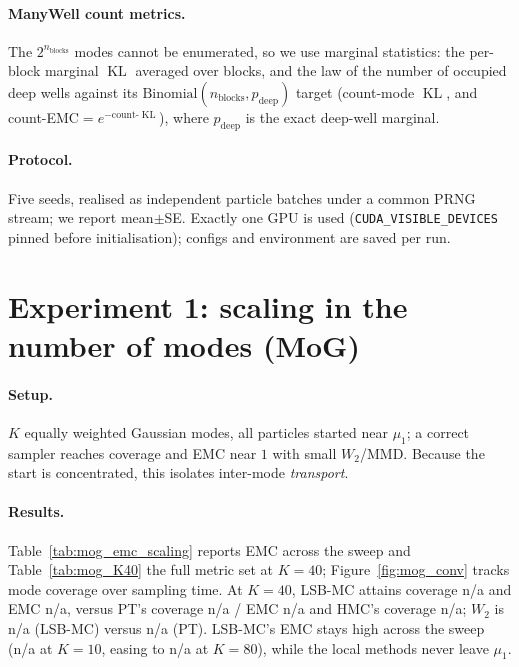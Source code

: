 \documentclass[11pt]{article}
\theoremstyle{plain}
\theoremstyle{remark}
\DeclareMathOperator{\KL}{KL}
\providecommand{\MogLSBcovK}{n/a}\providecommand{\MogLSBemcK}{n/a}
\providecommand{\MogPTcovK}{n/a}\providecommand{\MogPTemcK}{n/a}
\providecommand{\MogHMCcovK}{n/a}\providecommand{\MogLSBwtwoK}{n/a}
\providecommand{\MogPTwtwoK}{n/a}\providecommand{\MogLSBemcSmall}{n/a}
\providecommand{\MogLSBemcBig}{n/a}\providecommand{\MogLSBruntimeBig}{n/a}
\begin{document}
\paragraph{ManyWell count metrics.} The $2^{n_{\text{blocks}}}$ modes cannot be
enumerated, so we use marginal statistics: the per-block marginal
$\KL$ averaged over blocks, and the law of the number of occupied deep wells
against its $\mathrm{Binomial}(n_{\text{blocks}},p_{\text{deep}})$ target
(count-mode $\KL$, and count-EMC$=e^{-\text{count-}\KL}$), where $p_{\text{deep}}$
is the exact deep-well marginal.

\paragraph{Protocol.} Five seeds, realised as independent particle batches under a
common PRNG stream; we report mean$\pm$SE. Exactly one GPU is used
(\texttt{CUDA\_VISIBLE\_DEVICES} pinned before initialisation); configs and
environment are saved per run.

\section{Experiment 1: scaling in the number of modes (MoG)}\label{sec:mog}
\paragraph{Setup.} $K$ equally weighted Gaussian modes, all particles started near
$\mu_1$; a correct sampler reaches coverage and EMC near $1$ with small $W_2$/MMD.
Because the start is concentrated, this isolates inter-mode \emph{transport}.

\paragraph{Results.} Table~\ref{tab:mog_emc_scaling} reports EMC across the sweep
and Table~\ref{tab:mog_K40} the full metric set at $K{=}40$;
Figure~\ref{fig:mog_conv} tracks mode coverage over sampling time. At $K{=}40$,
LSB-MC attains coverage \MogLSBcovK{} and EMC \MogLSBemcK, versus PT's coverage
\MogPTcovK{} / EMC \MogPTemcK{} and HMC's coverage \MogHMCcovK; $W_2$ is
\MogLSBwtwoK{} (LSB-MC) versus \MogPTwtwoK{} (PT). LSB-MC's EMC stays high across
the sweep (\MogLSBemcSmall{} at $K{=}10$, easing to \MogLSBemcBig{} at $K{=}80$),
while the local methods never leave $\mu_1$.
\end{document}
